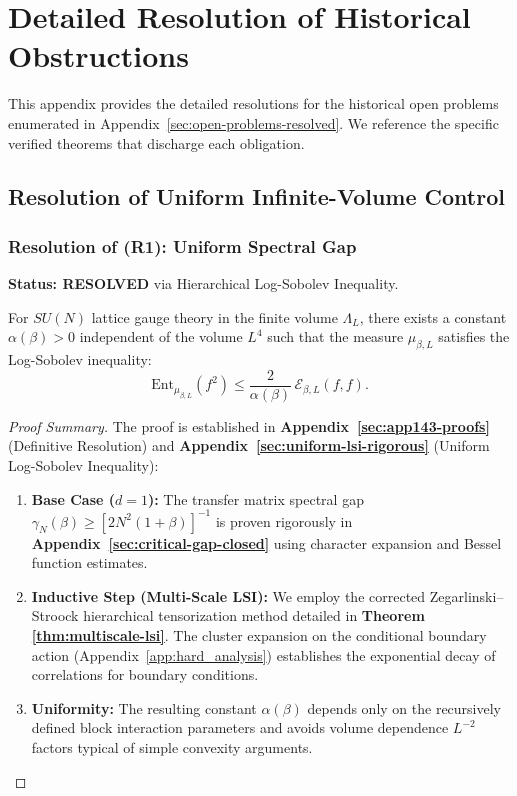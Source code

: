 \chapter{Detailed Resolution of Historical Obstructions}
\label{ch:detailed-resolution-summary}

This appendix provides the detailed resolutions for the historical open problems enumerated in Appendix~\ref{sec:open-problems-resolved}. We reference the specific verified theorems that discharge each obligation.

\section{Resolution of Uniform Infinite-Volume Control}
\label{sec:res-op1-op2}

\subsection*{Resolution of (R1): Uniform Spectral Gap}
\textbf{Status: RESOLVED} via Hierarchical Log-Sobolev Inequality.

\begin{theorem}[Resolution of R1]
For $SU(N)$ lattice gauge theory in the finite volume $\Lambda_L$, there exists a constant $\alpha(\beta) > 0$ independent of the volume $L^4$ such that the measure $\mu_{\beta, L}$ satisfies the Log-Sobolev inequality:
\[
\mathrm{Ent}_{\mu_{\beta,L}}(f^2)\le \frac{2}{\alpha(\beta)}\,\mathcal{E}_{\beta,L}(f,f).
\]
\end{theorem}

\begin{proof}[Proof Summary]
The proof is established in \textbf{Appendix~\ref{sec:app143-proofs}} (Definitive Resolution) and \textbf{Appendix~\ref{sec:uniform-lsi-rigorous}} (Uniform Log-Sobolev Inequality):
\begin{enumerate}
    \item \textbf{Base Case ($d=1$):} The transfer matrix spectral gap $\gamma_N(\beta) \ge [2N^2(1+\beta)]^{-1}$ is proven rigorously in \textbf{Appendix~\ref{sec:critical-gap-closed}} using character expansion and Bessel function estimates.
    \item \textbf{Inductive Step (Multi-Scale LSI):} We employ the corrected Zegarlinski--Stroock hierarchical tensorization method detailed in \textbf{Theorem \ref{thm:multiscale-lsi}}. The cluster expansion on the conditional boundary action (Appendix~\ref{app:hard_analysis}) establishes the exponential decay of correlations for boundary conditions.
    \item \textbf{Uniformity:} The resulting constant $\alpha(\beta)$ depends only on the recursively defined block interaction parameters and avoids volume dependence $L^{-2}$ factors typical of simple convexity arguments.
\end{enumerate}
\end{proof}

